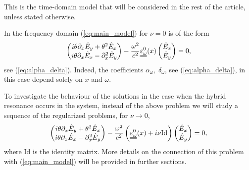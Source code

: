 {This is the time-domain model that will be considered in the rest of the article, unless stated otherwise. 

In the frequency domain (\ref{eq:main_model}) for $\nu=0$ is of the form 
\begin{align}
\label{eq:main_frequency_domain_intro}
\left(
\begin{matrix}
 i\theta \partial_x \hat{E}_y+\theta^2 \hat{E}_x\\
 i\theta \partial_x \hat{E}_x -\partial_x^2 \hat{E}_y
\end{matrix}
\right)-\frac{\omega^2}{c^2}
\uuline{\varepsilon_{\omega}^{0}}(x)\left(
\begin{matrix}
 \hat{E}_x\\
 \hat{E}_y
\end{matrix}
\right)
=0,
\end{align}
see (\ref{eq:alpha_delta}). Indeed, the coefficients $\alpha_{\omega},\;\delta_{\omega}$, see (\ref{eq:alpha_delta}), in this case depend solely on $x$ and $\omega$.  

To investigate the behaviour of the solutions in the case when the hybrid resonance occurs in the system, 
instead of the above problem we will study a sequence of the regularized problems, for $\nu\rightarrow 0$, 
\begin{align}
\label{eq:seq_regularized}
\left(
\begin{matrix}
 i\theta \partial_x \hat{E}_y+\theta^2 \hat{E}_x\\
 i\theta \partial_x \hat{E}_x -\partial_x^2 \hat{E}_y
\end{matrix}
\right)-\frac{\omega^2}{c^2}
\left(\uuline{\varepsilon_{\omega}^{0}}(x)+i\nu \mathrm{Id}\right)\left(
\begin{matrix}
 \hat{E}_x\\
 \hat{E}_y
\end{matrix}
\right)
=0,
\end{align}
where $\mathrm{Id}$ is the identity matrix. More details on the connection of this problem with (\ref{eq:main_model}) will be provided in further sections. 

}
